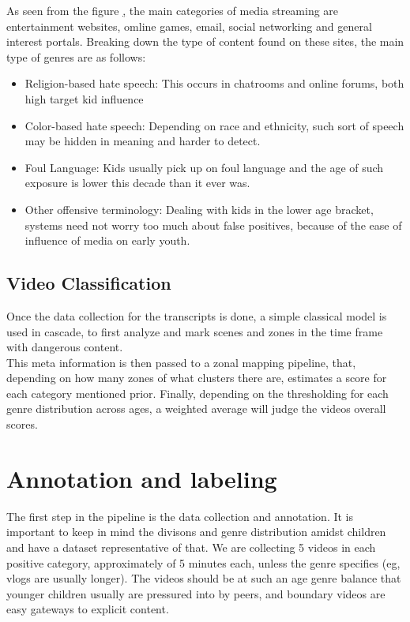 \documentclass{article}[A4]
\begin{document}
As seen from the figure \href{fig:genre_dist}, the main categories of media streaming are entertainment
websites, omline games, email, social networking and general interest portals. Breaking down the type of content
found on these sites, the main type of genres are as follows: \\
\begin{itemize}
    \item{Religion-based hate speech: This occurs in chatrooms and online forums, both high target kid influence}
    \item{Color-based hate speech: Depending on race and ethnicity, such sort of speech may be hidden in meaning and
    harder to detect.}
    \item{Foul Language: Kids usually pick up on foul language and the age of such exposure is lower this decade
    than it ever was.}
    \item{Other offensive terminology: Dealing with kids in the lower age bracket, systems need not worry too much about false positives,
    because of the ease of influence of media on early youth.}
\end{itemize}

\subsection{Video Classification}

Once the data collection for the transcripts is done, a simple classical model is used in cascade, to first analyze
and mark scenes and zones in the time frame with dangerous content.\\

This meta information is then passed to a zonal mapping pipeline, that, depending on how many zones of what clusters there are,
estimates a score for each category mentioned prior. Finally, depending on the thresholding for each genre distribution across ages,
a weighted average will judge the videos overall scores.

\section{Annotation and labeling}

The first step in the pipeline is the data collection and annotation. It is important to keep in mind the divisons
and genre distribution amidst children and have a dataset representative of that. We are collecting 5 videos in each positive category,
approximately of 5 minutes each, unless the genre specifies (eg, vlogs are usually longer). The videos should be at such an age genre balance
that younger children usually are pressured into by peers, and boundary videos are easy gateways to explicit content. \\
\end{document}
